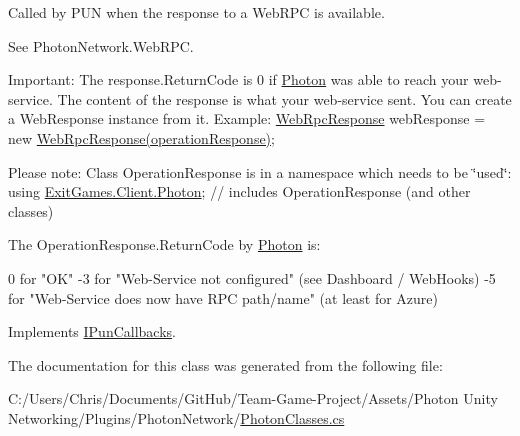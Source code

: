 Called by P\+UN when the response to a Web\+R\+PC is available. 

See Photon\+Network.\+Web\+R\+PC. 

Important\+: The response.\+Return\+Code is 0 if \hyperlink{namespace_photon}{Photon} was able to reach your web-\/service. The content of the response is what your web-\/service sent. You can create a Web\+Response instance from it. Example\+: \hyperlink{class_web_rpc_response}{Web\+Rpc\+Response} web\+Response = new \hyperlink{class_web_rpc_response}{Web\+Rpc\+Response(operation\+Response)};

Please note\+: Class Operation\+Response is in a namespace which needs to be \char`\"{}used\char`\"{}\+: using \hyperlink{namespace_exit_games_1_1_client_1_1_photon}{Exit\+Games.\+Client.\+Photon}; // includes Operation\+Response (and other classes)

The Operation\+Response.\+Return\+Code by \hyperlink{namespace_photon}{Photon} is\+:
\begin{DoxyPre}
 0 for "OK"
-3 for "Web-Service not configured" (see Dashboard / WebHooks)
-5 for "Web-Service does now have RPC path/name" (at least for Azure)\end{DoxyPre}
 

Implements \hyperlink{interface_i_pun_callbacks_aae3221aa2d3b999574fc55a6aaee2877}{I\+Pun\+Callbacks}.



The documentation for this class was generated from the following file\+:\begin{DoxyCompactItemize}
\item 
C\+:/\+Users/\+Chris/\+Documents/\+Git\+Hub/\+Team-\/\+Game-\/\+Project/\+Assets/\+Photon Unity Networking/\+Plugins/\+Photon\+Network/\hyperlink{_photon_classes_8cs}{Photon\+Classes.\+cs}\end{DoxyCompactItemize}
